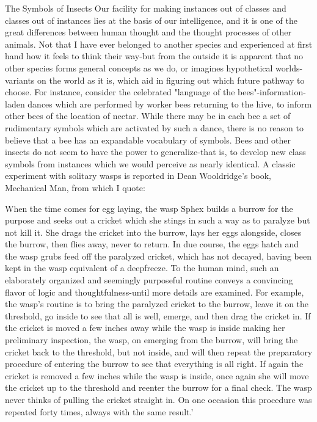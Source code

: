                                The Symbols of Insects
Our facility for making instances out of classes and classes out of instances lies at the
basis of our intelligence, and it is one of the great differences between human thought and
the thought processes of other animals. Not that I have ever belonged to another species
and experienced at first hand how it feels to think their way-but from the outside it is
apparent that no other species forms general concepts as we do, or imagines hypothetical
worlds-variants on the world as it is, which aid in figuring out which future pathway to
choose. For instance, consider the celebrated "language of the bees"-information-laden
dances which are performed by worker bees returning to the hive, to inform other bees of
the location of nectar. While there may be in each bee a set of rudimentary symbols
which are activated by such a dance, there is no reason to believe that a bee has an
expandable vocabulary of symbols. Bees and other insects do not seem to have the power
to generalize-that is, to develop new class symbols from instances which we would
perceive as nearly identical.
A classic experiment with solitary wasps is reported in Dean Wooldridge's book,
Mechanical Man, from which I quote:

  When the time comes for egg laying, the wasp Sphex builds a burrow for the
  purpose and seeks out a cricket which she stings in such a way as to paralyze but not
  kill it. She drags the cricket into the burrow, lays her eggs alongside, closes the
  burrow, then flies away, never to return. In due course, the eggs hatch and the wasp
  grubs feed off the paralyzed cricket, which has not decayed, having been kept in the
  wasp equivalent of a deepfreeze. To the human mind, such an elaborately organized
  and seemingly purposeful routine conveys a convincing flavor of logic and
  thoughtfulness-until more details are examined. For example, the wasp's routine is to
  bring the paralyzed cricket to the burrow, leave it on the threshold, go inside to see
  that all is well, emerge, and then drag the cricket in. If the cricket is moved a few
  inches away while the wasp is inside making her preliminary inspection, the wasp,
  on emerging from the burrow, will bring the cricket back to the threshold, but not
  inside, and will then repeat the preparatory procedure of entering the burrow to see
  that everything is all right. If again the cricket is removed a few inches while the
  wasp is inside, once again she will move the cricket up to the threshold and reenter
  the burrow for a final check. The wasp never thinks of pulling the cricket straight in.
  On one occasion this procedure was repeated forty times, always with the same
  result.'




